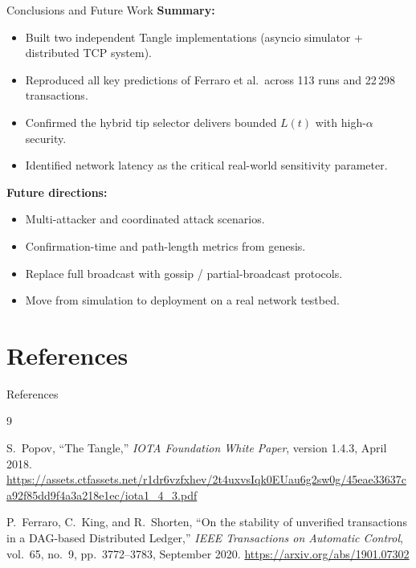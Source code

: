 \documentclass[aspectratio=169]{beamer}
\begin{document}
\begin{frame}{Conclusions and Future Work}
  \textbf{Summary:}
  \begin{itemize}
    \item Built two independent Tangle implementations (asyncio simulator + distributed TCP system).
    \item Reproduced all key predictions of Ferraro et al.\ across 113 runs and 22\,298 transactions.
    \item Confirmed the hybrid tip selector delivers bounded $L(t)$ with high-$\alpha$ security.
    \item Identified network latency as the critical real-world sensitivity parameter.
  \end{itemize}

  \bigskip
  \textbf{Future directions:}
  \begin{itemize}
    \item Multi-attacker and coordinated attack scenarios.
    \item Confirmation-time and path-length metrics from genesis.
    \item Replace full broadcast with gossip / partial-broadcast protocols.
    \item Move from simulation to deployment on a real network testbed.
  \end{itemize}
\end{frame}

\section*{References}

\begin{frame}{References}
  \begin{thebibliography}{9}

  S.~Popov,
  ``The Tangle,''
  \textit{IOTA Foundation White Paper}, version 1.4.3, April 2018.
  \url{https://assets.ctfassets.net/r1dr6vzfxhev/2t4uxvsIqk0EUau6g2sw0g/45eae33637ca92f85dd9f4a3a218e1ec/iota1_4_3.pdf}

  \bigskip
  P.~Ferraro, C.~King, and R.~Shorten,
  ``On the stability of unverified transactions in a DAG-based Distributed Ledger,''
  \textit{IEEE Transactions on Automatic Control}, vol.~65, no.~9, pp.~3772--3783, September 2020.
  \url{https://arxiv.org/abs/1901.07302}

  \end{thebibliography}
\end{frame}
\end{document}
